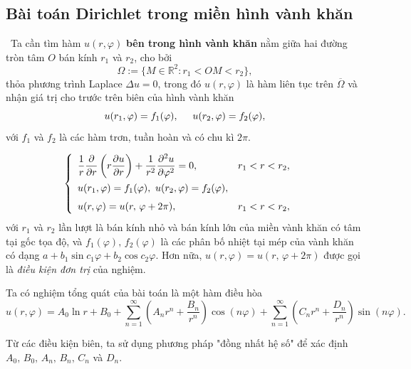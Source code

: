 \documentclass[10pt, a4paper]{article}
\begin{document}
	\subsection{Bài toán Dirichlet trong miền hình vành khăn}
	\vspace{2mm}
	\quad\,\,\,Ta cần tìm hàm $u(r,\varphi)$ \textbf{bên trong hình vành khăn} nằm giữa hai đường tròn tâm $O$ bán kính $r_1$ và $r_2$, cho bởi $$\Omega:=\{M\in\mathbb R^2:r_1<OM<r_2\},$$
	thỏa phương trình Laplace $\Delta u=0$, trong đó $u(r,\varphi)$ là hàm liên tục trên $\overline\Omega$ và nhận giá trị cho trước trên biên của hình vành khăn $$u(r_1,\varphi)=f_1(\varphi),\hspace{0.5cm}u(r_2,\varphi)=f_2(\varphi),$$
	với $f_1$ và $f_2$ là các hàm trơn, tuần hoàn và có chu kì $2\pi$.
	\vspace{2mm}
	\begin{tcolorbox}[enhanced,colback=blue!5!white,colframe=blue!75!black,sharp corners=all,shadow={0mm}{0mm}{-1.5mm}%
		{fill=blue!75!red,opacity=0.3},title=\textbf{Dạng của bài toán}]
		$$\begin{cases}
			\begin{array}{ll}
				\dfrac1r\dfrac{\partial}{\partial r}\left(r\dfrac{\partial u}{\partial r}\right)+\dfrac{1}{r^2}\dfrac{\partial^2u}{\partial\varphi^2}=0, & r_1<r<r_2,\\
				\noalign{\vskip3pt}
				u(r_1,\varphi)=f_1(\varphi),~u(r_2,\varphi)=f_2(\varphi),\\
				\noalign{\vskip4pt}
				u(r,\varphi)=u(r,\,\varphi+2\pi), & r_1<r<r_2,
			\end{array}
		\end{cases}$$
		với $r_1$ và $r_2$ lần lượt là bán kính nhỏ và bán kính lớn của miền vành khăn có tâm tại gốc tọa độ, và $f_1(\varphi),\,f_2(\varphi)$ là các phân bố nhiệt tại mép của vành khăn có dạng $a+b_1\sin c_1\varphi+b_2\cos c_2\varphi$.\vskip7pt
		Hơn nữa, $u(r,\varphi)=u(r,\,\varphi+2\pi)$ được gọi là \textit{điều kiện đơn trị} của nghiệm.
	\end{tcolorbox}
	\vspace{2mm}
	Ta có nghiệm tổng quát của bài toán là một hàm điều hòa $$u(r,\varphi)=A_0\ln r+B_0+\displaystyle\sum_{n=1}^\infty\left(A_nr^n+\dfrac{B_n}{r^n}\right)\cos(n\varphi)+\displaystyle\sum_{n=1}^\infty\left(C_nr^n+\dfrac{D_n}{r^n}\right)\sin(n\varphi).$$
	
	Từ các điều kiện biên, ta sử dụng phương pháp "đồng nhất hệ số" để xác định $A_0,\,B_0,\,A_n,\,B_n,\,C_n$ và $D_n$.\\
	
\end{document}
